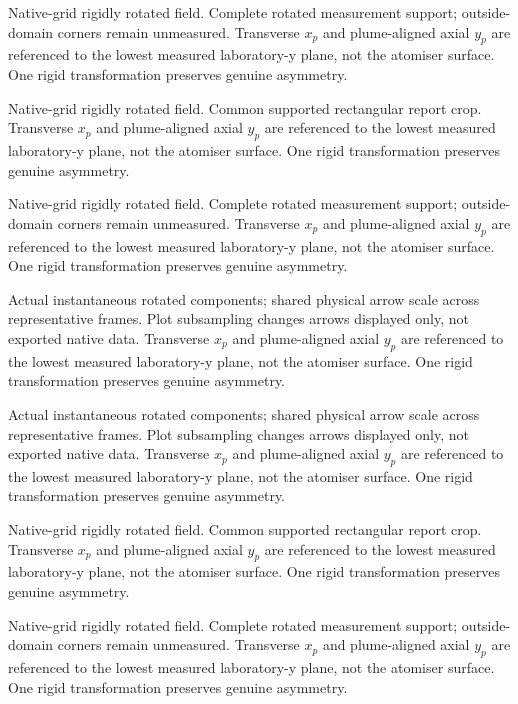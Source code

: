 \caption{Native-grid rigidly rotated field. Complete rotated measurement support; outside-domain corners remain unmeasured. Transverse $x_p$ and plume-aligned axial $y_p$ are referenced to the lowest measured laboratory-y plane, not the atomiser surface. One rigid transformation preserves genuine asymmetry.}

\caption{Native-grid rigidly rotated field. Common supported rectangular report crop. Transverse $x_p$ and plume-aligned axial $y_p$ are referenced to the lowest measured laboratory-y plane, not the atomiser surface. One rigid transformation preserves genuine asymmetry.}

\caption{Native-grid rigidly rotated field. Complete rotated measurement support; outside-domain corners remain unmeasured. Transverse $x_p$ and plume-aligned axial $y_p$ are referenced to the lowest measured laboratory-y plane, not the atomiser surface. One rigid transformation preserves genuine asymmetry.}

\caption{Actual instantaneous rotated components; shared physical arrow scale across representative frames. Plot subsampling changes arrows displayed only, not exported native data. Transverse $x_p$ and plume-aligned axial $y_p$ are referenced to the lowest measured laboratory-y plane, not the atomiser surface. One rigid transformation preserves genuine asymmetry.}

\caption{Actual instantaneous rotated components; shared physical arrow scale across representative frames. Plot subsampling changes arrows displayed only, not exported native data. Transverse $x_p$ and plume-aligned axial $y_p$ are referenced to the lowest measured laboratory-y plane, not the atomiser surface. One rigid transformation preserves genuine asymmetry.}

\caption{Native-grid rigidly rotated field. Common supported rectangular report crop. Transverse $x_p$ and plume-aligned axial $y_p$ are referenced to the lowest measured laboratory-y plane, not the atomiser surface. One rigid transformation preserves genuine asymmetry.}

\caption{Native-grid rigidly rotated field. Complete rotated measurement support; outside-domain corners remain unmeasured. Transverse $x_p$ and plume-aligned axial $y_p$ are referenced to the lowest measured laboratory-y plane, not the atomiser surface. One rigid transformation preserves genuine asymmetry.}

